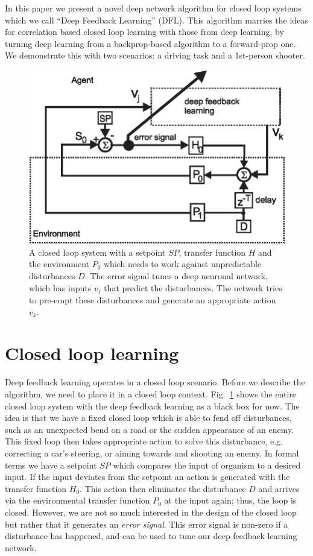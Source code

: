 \documentclass{aamas2018}
\begin{document}
In this paper we present a novel deep network algorithm for closed
loop systems which we call ``Deep Feedback Learning'' (DFL). This
algorithm marries the ideas for correlation based closed loop learning
with those from deep learning, by turning deep learning from a
backprop-based algorithm to a forward-prop one. We demonstrate this
with two scenarios: a driving task and a 1st-person shooter.

\begin{figure}[!ht]
  \centering
  \includegraphics[width=0.75\columnwidth]{closed_loop}
  \caption{A closed loop system with a setpoint $SP$, transfer function $H$ and the
    environment $P_0$ which needs to work against unpredictable disturbances $D$.
    The error signal tunes a deep neuronal network, which has inputs
    $v_j$ that predict the disturbances. The network tries to pre-empt these
    disturbances and generate an appropriate action $v_k$.
    \label{closed_loop}}
\end{figure}

\section{Closed loop learning}
Deep feedback learning operates in a closed loop scenario. Before we
describe the algorithm, we need to place it in a closed loop
context. Fig.~\ref{closed_loop} shows the entire closed loop system
with the deep feedback learning as a black box for now. The idea is
that we have a fixed closed loop which is able to fend off
disturbances, such as an unexpected bend on a road or the sudden
appearance of an enemy. This fixed loop then takes appropriate action
to solve this disturbance, e.g. correcting a car's steering, or aiming
towards and shooting an enemy. In formal terms we have a setpoint $SP$
which compares the input of organism to a desired input. If the input
deviates from the setpoint an action is generated with the transfer
function $H_0$. This action then eliminates the disturbance $D$ and
arrives via the environmental transfer function $P_0$ at the input
again; thus, the loop is closed. However, we are not so much
interested in the design of the closed loop but rather that it
generates an \textsl{error signal}. This error signal is non-zero if a
disturbance has happened, and can be used to tune our deep feedback
learning network.
\end{document}
